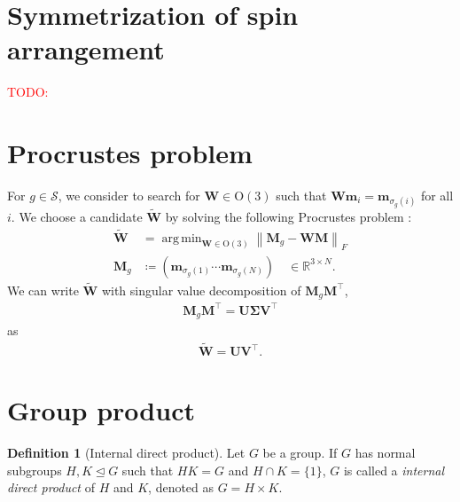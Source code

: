 \documentclass[a4paper, 11pt]{article}
\theoremstyle{definition}
\newcommand{\term}[1]{\textit{#1}}
\newcommand{\todo}[1]{\textcolor{red}{TODO: #1}}
\newcommand{\norm}[1]{\left\lVert#1\right\rVert}
\DeclareMathOperator*{\argmin}{arg\,min}
\newtheorem{definition}[theorem]{Definition}
\begin{document}
\section{Symmetrization of spin arrangement}

\todo{}

\appendix

\section{\label{appx:procrustes}Procrustes problem}

For $g \in \mathcal{S}$, we consider to search for $\bm{W} \in \mathrm{O}(3)$ such that $\bm{W} \bm{m}_{i} = \bm{m}_{\sigma_{g}(i)}$ for all $i$.
We choose a candidate $\tilde{\bm{W}}$ by solving the following Procrustes problem \cite{10.1093/acprof:oso/9780198510581.001.0001}:
\begin{align}
  \tilde{\bm{W}}
    &=\argmin_{ \bm{W} \in \mathrm{O}(3) } \norm{ \bm{M}_{g} - \bm{W} \bm{M} }_{F} \\
  \bm{M}_{g}
    &\coloneqq \left( \bm{m}_{\sigma_{g}(1)} \cdots \bm{m}_{\sigma_{g}(N)} \right)
    \quad \in \mathbb{R}^{3 \times N}.
\end{align}
We can write $\tilde{\bm{W}}$ with singular value decomposition of $\bm{M}_{g} \bm{M}^{\top}$,
\begin{align}
  \bm{M}_{g} \bm{M}^{\top}
    = \bm{U} \bm{\Sigma} \bm{V}^{\top}
\end{align}
as
\begin{align}
  \tilde{\bm{W}} = \bm{U} \bm{V}^{\top}.
\end{align}

\section{\label{appx:group}Group product}

\begin{screen}
  \begin{definition}[Internal direct product]
    Let $G$ be a group.
    If $G$ has normal subgroups $H, K \trianglelefteq G$ such that $HK = G$ and $H \cap K = \{ 1 \}$, $G$ is called a \term{internal direct product} of $H$ and $K$, denoted as $G = H \times K$.
  \end{definition}
\end{screen}
\end{document}
